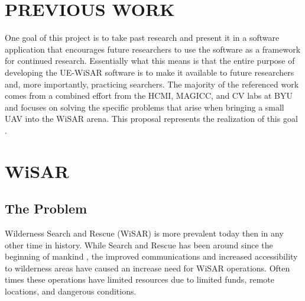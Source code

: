 \documentclass[12pt]{IEEEtran}
\begin{document}

\section{PREVIOUS WORK}
One goal of this project is to take past research and present it in a software
application that encourages future researchers to use the software as a
framework for continued research.  Essentially what this means is that the
entire purpose of developing the UE-WiSAR software is to make it available
to future researchers and, more importantly, practicing searchers.  The majority
of the referenced work comes from a combined effort from the HCMI, MAGICC, and CV labs at BYU and focuses on solving
the specific problems that arise when bringing a small UAV into the WiSAR arena.
This proposal represents the realization of this goal
\cite{lin2010supporting}.
  
  
\section{WiSAR}
\subsection{The Problem}
Wilderness Search and Rescue (WiSAR) is more prevalent today then in any other
time in history.  While Search and Rescue has been around since the beginning of
mankind \cite[p.~13]{setnicka1980}, the improved communications and increased
accessibility to wilderness areas have caused an increase need for WiSAR
operations.  Often times these operations have limited resources due to limited
funds, remote locations, and dangerous conditions.

\end{document}

